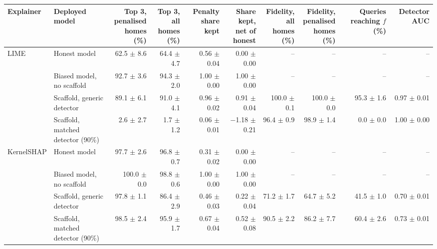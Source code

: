 \begin{table}[t]
\centering
\footnotesize
\setlength{\tabcolsep}{3.5pt}
\begin{adjustbox}{max width=\linewidth}
\begin{tabular}{llrrrrrrrr}
\toprule
Explainer & \makecell[b]{Deployed \\ model} & \makecell[b]{Top 3, \\ penalised \\ homes (\%)} & \makecell[b]{Top 3, all \\ homes (\%)} & \makecell[b]{Penalty share \\ kept} & \makecell[b]{Share kept, \\ net of honest} & \makecell[b]{Fidelity, all \\ homes (\%)} & \makecell[b]{Fidelity, \\ penalised \\ homes (\%)} & \makecell[b]{Queries \\ reaching $f$ \\ (\%)} & Detector AUC \\
\midrule
LIME & Honest model & 62.5 $\pm$ 8.6 & 64.4 $\pm$ 4.7 & 0.56 $\pm$ 0.04 & 0.00 $\pm$ 0.00 & -- & -- & -- & -- \\
 & Biased model, no scaffold & 92.7 $\pm$ 3.6 & 94.3 $\pm$ 2.0 & 1.00 $\pm$ 0.00 & 1.00 $\pm$ 0.00 & -- & -- & -- & -- \\
 & Scaffold, generic detector & 89.1 $\pm$ 6.1 & 91.0 $\pm$ 4.1 & 0.96 $\pm$ 0.02 & 0.91 $\pm$ 0.04 & 100.0 $\pm$ 0.1 & 100.0 $\pm$ 0.0 & 95.3 $\pm$ 1.6 & 0.97 $\pm$ 0.01 \\
 & Scaffold, matched detector (90\%) & 2.6 $\pm$ 2.7 & 1.7 $\pm$ 1.2 & 0.06 $\pm$ 0.01 & $-$1.18 $\pm$ 0.21 & 96.4 $\pm$ 0.9 & 98.9 $\pm$ 1.4 & 0.0 $\pm$ 0.0 & 1.00 $\pm$ 0.00 \\
\midrule
KernelSHAP & Honest model & 97.7 $\pm$ 2.6 & 96.8 $\pm$ 0.7 & 0.31 $\pm$ 0.02 & 0.00 $\pm$ 0.00 & -- & -- & -- & -- \\
 & Biased model, no scaffold & 100.0 $\pm$ 0.0 & 98.8 $\pm$ 0.6 & 1.00 $\pm$ 0.00 & 1.00 $\pm$ 0.00 & -- & -- & -- & -- \\
 & Scaffold, generic detector & 97.8 $\pm$ 1.1 & 86.4 $\pm$ 2.9 & 0.46 $\pm$ 0.03 & 0.22 $\pm$ 0.04 & 71.2 $\pm$ 1.7 & 64.7 $\pm$ 5.2 & 41.5 $\pm$ 1.0 & 0.70 $\pm$ 0.01 \\
 & Scaffold, matched detector (90\%) & 98.5 $\pm$ 2.4 & 95.9 $\pm$ 1.7 & 0.67 $\pm$ 0.04 & 0.52 $\pm$ 0.08 & 90.5 $\pm$ 2.2 & 86.2 $\pm$ 7.7 & 60.4 $\pm$ 2.6 & 0.73 $\pm$ 0.01 \\

\end{tabular}
\end{adjustbox}
\end{table}
